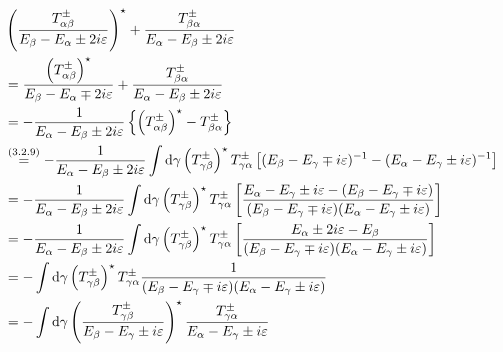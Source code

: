 \begin{widetext}
	\begin{align*}
		&\left(\dfrac{T_{\alpha\beta}^\pm}{E_\beta-E_\alpha\pm 2i\varepsilon}\right)^\star
		+\dfrac{T_{\beta\alpha}^\pm}{E_\alpha-E_\beta\pm 2i\varepsilon}\\
		&=\dfrac{\left(T_{\alpha\beta}^\pm\right)^\star}{E_\beta-E_\alpha\mp 2i\varepsilon}+\dfrac{T_{\beta\alpha}^\pm}{E_\alpha-E_\beta\pm 2i\varepsilon}\\
		&=-\dfrac{1}{E_\alpha-E_\beta\pm 2i\varepsilon}\left\{\left(T_{\alpha\beta}^\pm\right)^\star-T_{\beta\alpha}^\pm\right\}\\
		&\overset{({3.2.9})}{=}-\dfrac{1}{E_\alpha-E_\beta\pm 2i\varepsilon}\int\dd{\gamma}\left(T_{\gamma\beta}^\pm\right)^\star T_{\gamma\alpha}^\pm\left[(E_\beta-E_\gamma\mp i \varepsilon)^{-1}-(E_\alpha-E_\gamma\pm i \varepsilon)^{-1}\right]\\
		&=-\dfrac{1}{E_\alpha-E_\beta\pm 2i\varepsilon}\int\dd{\gamma}\left(T_{\gamma\beta}^\pm\right)^\star T_{\gamma\alpha}^\pm\left[\dfrac{E_\alpha-E_\gamma\pm i \varepsilon-(E_\beta-E_\gamma\mp i \varepsilon)}{(E_\beta-E_\gamma\mp i \varepsilon)(E_\alpha-E_\gamma\pm i \varepsilon)}\right]\\
		&=-\dfrac{1}{E_\alpha-E_\beta\pm 2i\varepsilon}\int\dd{\gamma}\left(T_{\gamma\beta}^\pm\right)^\star T_{\gamma\alpha}^\pm\left[\dfrac{E_\alpha\pm 2i \varepsilon-E_\beta}{(E_\beta-E_\gamma\mp i \varepsilon)(E_\alpha-E_\gamma\pm i \varepsilon)}\right]\\
		&=-\int\dd{\gamma}\left(T_{\gamma\beta}^\pm\right)^\star T_{\gamma\alpha}^\pm \dfrac{1}{(E_\beta-E_\gamma\mp i \varepsilon)(E_\alpha-E_\gamma\pm i \varepsilon)}\\
		&=-\int\dd{\gamma} \left(\dfrac{T_{\gamma\beta}^\pm}{E_\beta-E_\gamma\pm i \varepsilon}\right)^\star \dfrac{T_{\gamma\alpha}^\pm}{E_\alpha-E_\gamma\pm i \varepsilon}
	\end{align*}
	
	
\end{widetext}

